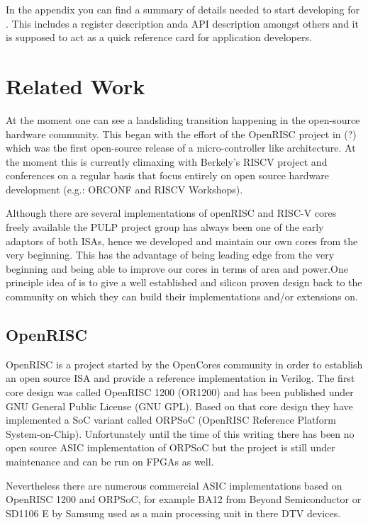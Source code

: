 In the appendix you can find a summary of details needed to start developing for \pulpino. This includes a register description anda API description amongst others and it is supposed to act as a quick reference card for application developers.

\section{Related Work}

At the moment one can see a landsliding transition happening in the open-source hardware community. This began with the effort of the OpenRISC project in (?) which was the first open-source release of a micro-controller like architecture.
At the moment this is currently climaxing with Berkely's RISCV project and conferences on a regular basis that focus entirely on open source hardware development (e.g.: ORCONF and RISCV Workshops).

Although there are several implementations of openRISC and RISC-V cores freely available the PULP project group has always been one of the early adaptors of both ISAs, hence we developed and maintain our own cores from the very beginning. This has the advantage of being leading edge from the very beginning and being able to improve our cores in terms of area and power.One principle idea of \pulpino is to give a well established and silicon proven design back to the community on which they can build their implementations and/or extensions on.

\subsection{OpenRISC}

OpenRISC is a project started by the OpenCores community in order to establish an open source ISA and provide a reference implementation in Verilog. The first core design was called OpenRISC 1200 (OR1200) and has been published under GNU General Public License (GNU GPL). Based on that core design they have implemented a SoC variant called ORPSoC (OpenRISC Reference Platform System-on-Chip). Unfortunately until the time of this writing there has been no open source ASIC implementation of ORPSoC but the project is still under maintenance and can be run on FPGAs as well.

Nevertheless there are numerous commercial ASIC implementations based on OpenRISC 1200 and ORPSoC, for example BA12 from Beyond Semiconductor or SD1106 E by Samsung used as a main processing unit in there \gls{DTV} devices.

